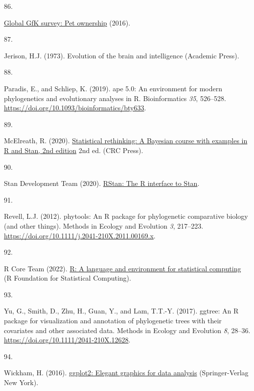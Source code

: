 \documentclass[
  man, donotrepeattitle,floatsintext]{apa6}
\newlength{\cslhangindent}
\newlength{\csllabelwidth}
\newlength{\cslentryspacingunit} %
\newenvironment{CSLReferences}[2] %
 {%
  \setlength{\parindent}{0pt}
  \ifodd #1
  \let\oldpar\par
  \def\par{\hangindent=\cslhangindent\oldpar}
  \fi
  \setlength{\parskip}{#2\cslentryspacingunit}
 }%
 {}
\newcommand{\CSLLeftMargin}[1]{\parbox[t]{\csllabelwidth}{#1}}
\newcommand{\CSLRightInline}[1]{\parbox[t]{\linewidth - \csllabelwidth}{#1}\break}
\begin{document}
\begin{CSLReferences}{0}{0}
\leavevmode{}%
\CSLLeftMargin{86. }%
\CSLRightInline{\href{http://www.gfk.com/global-studies/global-studies-pet-ownership}{Global GfK survey: Pet ownership} (2016).}

\leavevmode{}%
\CSLLeftMargin{87. }%
\CSLRightInline{Jerison, H.J. (1973). Evolution of the brain and intelligence (Academic Press).}

\leavevmode{}%
\CSLLeftMargin{88. }%
\CSLRightInline{Paradis, E., and Schliep, K. (2019). {ape} 5.0: An environment for modern phylogenetics and evolutionary analyses in {R}. Bioinformatics \emph{35}, 526--528. \url{https://doi.org/10.1093/bioinformatics/bty633}.}

\leavevmode{}%
\CSLLeftMargin{89. }%
\CSLRightInline{McElreath, R. (2020). \href{http://xcelab.net/rm/statistical-rethinking/}{Statistical rethinking: A {Bayesian} course with examples in {R} and {Stan}, 2nd edition} 2nd ed. (CRC Press).}

\leavevmode{}%
\CSLLeftMargin{90. }%
\CSLRightInline{Stan Development Team (2020). \href{http://mc-stan.org/}{{RStan}: The {R} interface to {Stan}}.}

\leavevmode{}%
\CSLLeftMargin{91. }%
\CSLRightInline{Revell, L.J. (2012). {phytools}: An {R} package for phylogenetic comparative biology (and other things). Methods in Ecology and Evolution \emph{3}, 217--223. \url{https://doi.org/10.1111/j.2041-210X.2011.00169.x}.}

\leavevmode{}%
\CSLLeftMargin{92. }%
\CSLRightInline{R Core Team (2022). \href{https://www.R-project.org/}{R: A language and environment for statistical computing} (R Foundation for Statistical Computing).}

\leavevmode{}%
\CSLLeftMargin{93. }%
\CSLRightInline{Yu, G., Smith, D., Zhu, H., Guan, Y., and Lam, T.T.-Y. (2017). {ggtree}: An {R} package for visualization and annotation of phylogenetic trees with their covariates and other associated data. Methods in Ecology and Evolution \emph{8}, 28--36. \url{https://doi.org/10.1111/2041-210X.12628}.}

\leavevmode{}%
\CSLLeftMargin{94. }%
\CSLRightInline{Wickham, H. (2016). \href{https://ggplot2.tidyverse.org}{{ggplot2}: Elegant graphics for data analysis} (Springer-Verlag New York).}


\end{CSLReferences}
\end{document}
